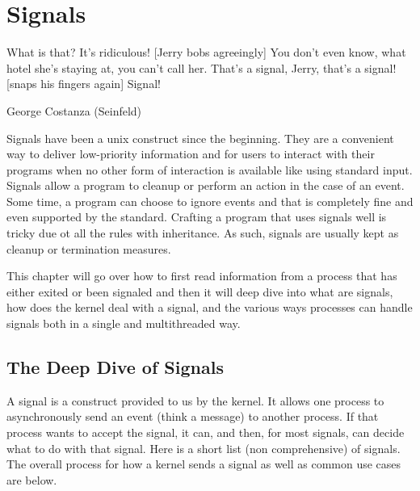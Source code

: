 \chapter{Signals}

\epigraph{What is that? It's ridiculous! [Jerry bobs agreeingly] You don't even know, what hotel she's staying at, you can't call her. That's a signal, Jerry, that's a signal! [snaps his fingers again] Signal!}{George Costanza (Seinfeld)}

Signals have been a unix construct since the beginning. They are a convenient way to deliver low-priority information and for users to interact with their programs when no other form of interaction is available like using standard input. Signals allow a program to cleanup or perform an action in the case of an event. Some time, a program can choose to ignore events and that is completely fine and even supported by the standard. Crafting a program that uses signals well is tricky due ot all the rules with inheritance. As such, signals are usually kept as cleanup or termination measures.

This chapter will go over how to first read information from a process that has either exited or been signaled and then it will deep dive into what are signals, how does the kernel deal with a signal, and the various ways processes can handle signals both in a single and multithreaded way.

\section{The Deep Dive of Signals}

A signal is a construct provided to us by the kernel. It allows one process to asynchronously send an event (think a message) to another process. If that process wants to accept the signal, it can, and then, for most signals, can decide what to do with that signal. Here is a short list (non comprehensive) of signals. The overall process for how a kernel sends a signal as well as common use cases are below.

